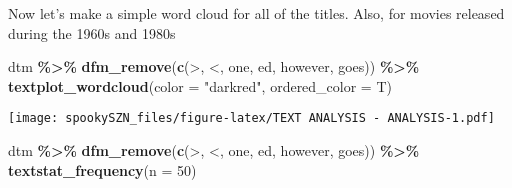 \documentclass[
]{article}
\newenvironment{Shaded}{\begin{snugshade}}{\end{snugshade}}
\newcommand{\AttributeTok}[1]{\textcolor[rgb]{0.13,0.29,0.53}{#1}}
\newcommand{\DecValTok}[1]{\textcolor[rgb]{0.00,0.00,0.81}{#1}}
\newcommand{\FunctionTok}[1]{\textcolor[rgb]{0.13,0.29,0.53}{\textbf{#1}}}
\newcommand{\NormalTok}[1]{#1}
\newcommand{\SpecialCharTok}[1]{\textcolor[rgb]{0.81,0.36,0.00}{\textbf{#1}}}
\newcommand{\StringTok}[1]{\textcolor[rgb]{0.31,0.60,0.02}{#1}}
\begin{document}
Now let's make a simple word cloud for all of the titles. Also, for
movies released during the 1960s and 1980s

\begin{Shaded}
\begin{Highlighting}[]
\NormalTok{dtm }\SpecialCharTok{\%\textgreater{}\%} 
  \FunctionTok{dfm\_remove}\NormalTok{(}\FunctionTok{c}\NormalTok{(}\StringTok{\textquotesingle{}\textgreater{}\textquotesingle{}}\NormalTok{, }\StringTok{\textquotesingle{}\textless{}\textquotesingle{}}\NormalTok{, }\StringTok{\textquotesingle{}one\textquotesingle{}}\NormalTok{, }\StringTok{\textquotesingle{}ed\textquotesingle{}}\NormalTok{, }\StringTok{\textquotesingle{}however\textquotesingle{}}\NormalTok{, }\StringTok{\textquotesingle{}goes\textquotesingle{}}\NormalTok{)) }\SpecialCharTok{\%\textgreater{}\%}
  \FunctionTok{textplot\_wordcloud}\NormalTok{(}\AttributeTok{color =} \StringTok{"darkred"}\NormalTok{, }\AttributeTok{ordered\_color =}\NormalTok{ T) }
\end{Highlighting}
\end{Shaded}

\texttt{[image: spookySZN\_files/figure-latex/TEXT ANALYSIS - ANALYSIS-1.pdf]}

\begin{Shaded}
\begin{Highlighting}[]
\NormalTok{dtm }\SpecialCharTok{\%\textgreater{}\%} 
  \FunctionTok{dfm\_remove}\NormalTok{(}\FunctionTok{c}\NormalTok{(}\StringTok{\textquotesingle{}\textgreater{}\textquotesingle{}}\NormalTok{, }\StringTok{\textquotesingle{}\textless{}\textquotesingle{}}\NormalTok{, }\StringTok{\textquotesingle{}one\textquotesingle{}}\NormalTok{, }\StringTok{\textquotesingle{}ed\textquotesingle{}}\NormalTok{, }\StringTok{\textquotesingle{}however\textquotesingle{}}\NormalTok{, }\StringTok{\textquotesingle{}goes\textquotesingle{}}\NormalTok{)) }\SpecialCharTok{\%\textgreater{}\%}
  \FunctionTok{textstat\_frequency}\NormalTok{(}\AttributeTok{n =} \DecValTok{50}\NormalTok{) }
\end{Highlighting}
\end{Shaded}
\end{document}

